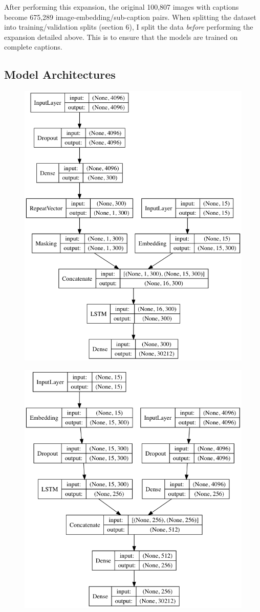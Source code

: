 \documentclass[letterpaper, 10 pt, conference]{ieeeconf}
\begin{document}
After performing this expansion, the original 100,807 images with captions become 675,289 image-embedding/sub-caption pairs. When splitting the dataset into training/validation splits (section 6), I split the data \textit{before} performing the expansion detailed above. This is to ensure that the models are trained on complete captions.

\subsection{Model Architectures}


\begin{figure}[h]
\centering
\begin{minipage}{.5\textwidth}
  \centering
  \includegraphics[width=.8\linewidth]{inject}
  \label{fig:test1}
\end{minipage}%
\begin{minipage}{.5\textwidth}
  \centering
  \includegraphics[width=.8\linewidth]{merge}

\end{minipage}
\end{figure}
\end{document}

